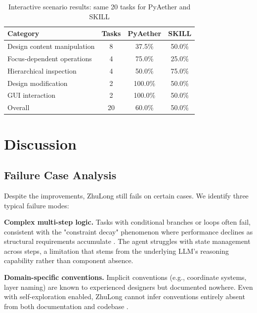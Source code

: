 \documentclass[anonymous, sigconf]{acmart}
\begin{document}
\begin{table}[htbp]
\centering
\caption{Interactive scenario results: same 20 tasks for PyAether and SKILL}
\label{tab:interactive-results}
\begin{tabular}{lccc}
\toprule
\textbf{Category} & \textbf{Tasks} & \textbf{PyAether} & \textbf{SKILL} \\
\midrule
Design content manipulation & 8 & 37.5\% & 50.0\% \\
Focus-dependent operations & 4 & 75.0\% & 25.0\% \\
Hierarchical inspection & 4 & 50.0\% & 75.0\% \\
Design modification & 2 & 100.0\% & 50.0\% \\
GUI interaction & 2 & 100.0\% & 50.0\% \\
\midrule
Overall & 20 & 60.0\% & 50.0\% \\
\bottomrule
\end{tabular}
\end{table}

\section{Discussion}
\label{sec:discussion}

\subsection{Failure Case Analysis}

Despite the improvements, ZhuLong still fails on certain cases. We identify three typical failure modes:

\textbf{Complex multi-step logic.} Tasks with conditional branches or loops often fail, consistent with the "constraint decay" phenomenon where performance declines as structural requirements accumulate \cite{dente2026constraint}. The agent struggles with state management across steps, a limitation that stems from the underlying LLM's reasoning capability rather than component absence.

\textbf{Domain-specific conventions.} Implicit conventions (e.g., coordinate systems, layer naming) are known to experienced designers but documented nowhere. Even with self-exploration enabled, ZhuLong cannot infer conventions entirely absent from both documentation and codebase \cite{jiang2024seed}.
\end{document}
